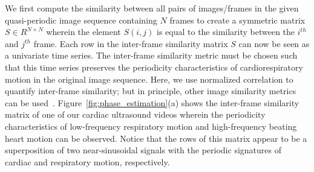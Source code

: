 \documentclass[journal]{IEEEtran}
\begin{document}
We first compute the similarity between all pairs of images/frames in the given quasi-periodic image sequence containing $N$ frames to create a symmetric matrix $S \in R^{N \times N}$ wherein the element $S(i,j)$ is equal to the similarity between the $i^{th}$ and $j^{th}$ frame. Each row in the inter-frame similarity matrix $S$ can now be seen as a univariate time series. The inter-frame similarity metric must be chosen such that this time series preserves the periodicity characteristics of cardiorespiratory motion in the original image sequence. Here, we use normalized correlation to quantify inter-frame similarity; but in principle, other image similarity metrics can be used~\cite{Yoo2004}. Figure~\ref{fig:phase_estimation}(a) shows the inter-frame similarity matrix of one of our cardiac ultrasound videos wherein the periodicity characteristics of low-frequency respiratory motion and high-frequency beating heart motion can be observed. Notice that the rows of this matrix appear to be a superposition of two near-sinusoidal signals with the periodic signatures of cardiac and respiratory motion, respectively.
\end{document}

